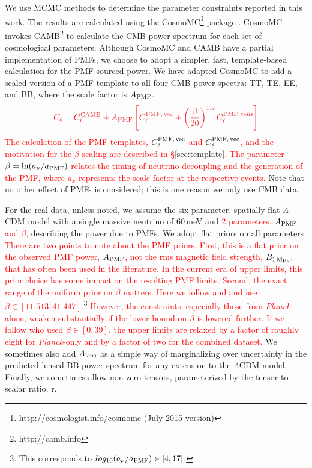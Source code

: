\documentclass[apj]{emulateapj}
\newcommand{\cpmftens}{\ensuremath{C_{\ell}^{\rm PMF,\,tens}}}
\newcommand{\cpmfvec}{\ensuremath{C_{\ell}^{\rm PMF,\,vec}}}
\newcommand{\apmf}{\ensuremath{A_{\rm PMF}}}
\newcommand{\bpmf}{\ensuremath{B_{\rm 1\,Mpc}}}
\newcommand{\alens}{\ensuremath{A_{\rm lens}}}
\newcommand{\lcdm}{\ensuremath{\Lambda}CDM}
\newcommand{\be}{\begin{equation}}
\newcommand{\ee}{\end{equation}}
\newcommand{\planck}{{\sl Planck}}
\newcommand{\changed}[1]{\textcolor{Red}{#1}}
\begin{document}
We use MCMC methods to determine the parameter constraints reported in this work. 
The results are calculated using  the {\textsc CosmoMC}\footnote{http://cosmologist.info/cosmomc (July 2015 version)} package \citep{lewis02b}. 
CosmoMC invokes  CAMB\footnote{http://camb.info}  \citep{lewis00} to calculate the CMB power spectrum for each set of cosmological parameters. 
Although CosmoMC and CAMB have a partial implementation of PMFs, we choose to adopt a simpler, fast, template-based calculation for the PMF-sourced power. 
We have adapted CosmoMC to add a scaled version of a PMF template to all four CMB power spectra: TT, TE, EE, and BB, where the scale factor is \apmf. 
\be
\changed{C_\ell = C_\ell^{\rm{CAMB}} + \apmf \left[\cpmfvec + \left(\frac{\beta}{20}\right)^{1.9}  \cpmftens \right]}
\ee
\changed{The calculation of the PMF templates, \cpmfvec{} and \cpmfvec{}, and the motivation for the $\beta$ scaling are described in \S\ref{sec:template}. 
The parameter $\beta = {\rm ln}(a_{\nu}/a_{\rm{PMF}})$ relates the timing of neutrino decoupling and the generation of the PMF, where $a_x$ represents the scale factor at the respective events. }
Note that no other effect of  PMFs is considered; this is one reason we only use CMB data.

For the real data, unless noted, we assume the six-parameter, spatially-flat \lcdm{} model with a single massive neutrino of 60\,meV and \changed{2 parameters, \apmf{} and $\beta$, }describing the power due to PMFs. 
We adopt flat priors on all parameters. 
\changed{There are two points to note about the PMF priors. 
First, this is a flat prior on the observed PMF power, $\apmf$, not the rms magnetic field strength, \bpmf, that has often been used in the literature. 
In the current era of upper limits, this prior choice has some impact on the resulting PMF limits. 
Second, the exact range of the uniform prior on $\beta$ matters. 
Here we follow \citet{planck15-19} and \citet{zucca16} and use $\beta \in [11.513, 41.447]$.\footnote{This corresponds to $log_{10} (a_{\nu}/a_{\rm{PMF}}) \in[4,17]$.}
However, the constraints, especially those from \planck{} alone, weaken substantially if the lower bound on $\beta$ is lowered further. 
If we follow \citet{polarbear15} who used $\beta \in [0,39]$, the upper limits are relaxed by a factor of roughly eight for \planck-only and by a factor of two for the combined dataset. }
We sometimes also add \alens{} as a simple way of marginalizing over uncertainty in the predicted lensed BB power spectrum for any extension to the \lcdm{} model. 
Finally, we sometimes allow non-zero tensors, parameterized by the tensor-to-scalar ratio, r. 
\end{document}
